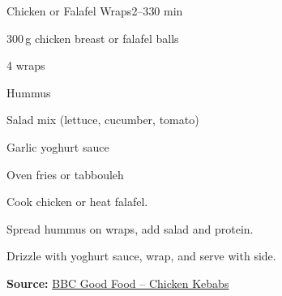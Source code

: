 \begin{recipebox}{Chicken or Falafel Wraps}{2--3}{30 min}
\begin{ingredients}
  \item 300\,g chicken breast or falafel balls
  \item 4 wraps
  \item Hummus
  \item Salad mix (lettuce, cucumber, tomato)
  \item Garlic yoghurt sauce
  \item Oven fries or tabbouleh
\end{ingredients}

\begin{method}
  \item Cook chicken or heat falafel.
  \item Spread hummus on wraps, add salad and protein.
  \item Drizzle with yoghurt sauce, wrap, and serve with side.
\end{method}
\textbf{Source:} \href{https://www.bbcgoodfood.com/recipes/chicken-kebabs}{BBC Good Food – Chicken Kebabs}
\end{recipebox}
